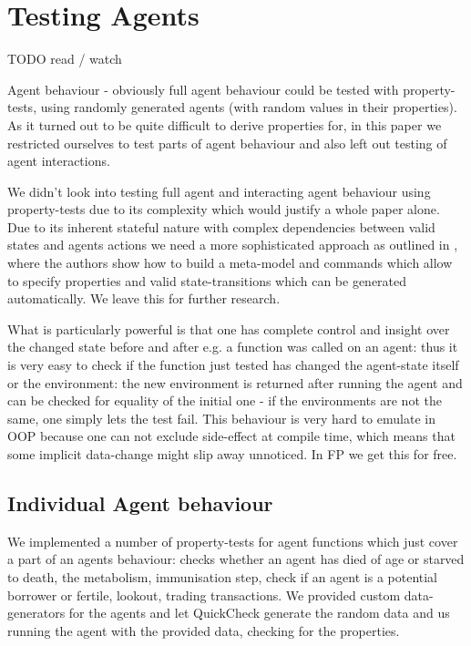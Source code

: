 \chapter{Testing Agents}
\label{ch:prop_agents}

TODO read / watch

Agent behaviour - obviously full agent behaviour could be tested with property-tests, using randomly generated agents (with random values in their properties). As it turned out to be quite difficult to derive properties for, in this paper we restricted ourselves to test parts of agent behaviour and also left out testing of agent interactions.

We didn't look into testing full agent and interacting agent behaviour using property-tests due to its complexity which would justify a whole paper alone. Due to its inherent stateful nature with complex dependencies between valid states and agents actions we need a more sophisticated approach as outlined in \cite{de_vries_-depth_2019}, where the authors show how to build a meta-model and commands which allow to specify properties and valid state-transitions which can be generated automatically. We leave this for further research.

What is particularly powerful is that one has complete control and insight over the changed state before and after e.g. a function was called on an agent: thus it is very easy to check if the function just tested has changed the agent-state itself or the environment: the new environment is returned after running the agent and can be checked for equality of the initial one - if the environments are not the same, one simply lets the test fail. This behaviour is very hard to emulate in OOP because one can not exclude side-effect at compile time, which means that some implicit data-change might slip away unnoticed. In FP we get this for free.

\section{Individual Agent behaviour}
We implemented a number of property-tests for agent functions which just cover a part of an agents behaviour: checks whether an agent has died of age or starved to death, the metabolism, immunisation step, check if an agent is a potential borrower or fertile, lookout, trading transactions. We provided custom data-generators for the agents and let QuickCheck generate the random data and us running the agent with the provided data, checking for the properties. 


